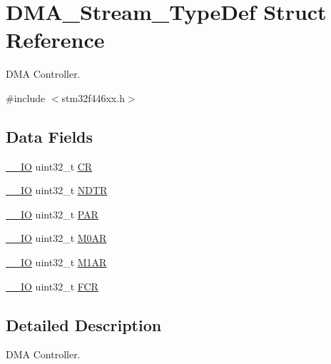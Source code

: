 \hypertarget{struct_d_m_a___stream___type_def}{}\section{D\+M\+A\+\_\+\+Stream\+\_\+\+Type\+Def Struct Reference}
\label{struct_d_m_a___stream___type_def}


D\+MA Controller.  




{\ttfamily \#include $<$stm32f446xx.\+h$>$}

\subsection*{Data Fields}
\begin{DoxyCompactItemize}
\item 
\mbox{\hyperlink{core__sc300_8h_aec43007d9998a0a0e01faede4133d6be}{\+\_\+\+\_\+\+IO}} uint32\+\_\+t \mbox{\hyperlink{struct_d_m_a___stream___type_def_ab40c89c59391aaa9d9a8ec011dd0907a}{CR}}
\item 
\mbox{\hyperlink{core__sc300_8h_aec43007d9998a0a0e01faede4133d6be}{\+\_\+\+\_\+\+IO}} uint32\+\_\+t \mbox{\hyperlink{struct_d_m_a___stream___type_def_af60258ad5a25addc1e8969665d0c1731}{N\+D\+TR}}
\item 
\mbox{\hyperlink{core__sc300_8h_aec43007d9998a0a0e01faede4133d6be}{\+\_\+\+\_\+\+IO}} uint32\+\_\+t \mbox{\hyperlink{struct_d_m_a___stream___type_def_aef55be3d948c22dd32a97e8d4f8761fd}{P\+AR}}
\item 
\mbox{\hyperlink{core__sc300_8h_aec43007d9998a0a0e01faede4133d6be}{\+\_\+\+\_\+\+IO}} uint32\+\_\+t \mbox{\hyperlink{struct_d_m_a___stream___type_def_a63b4d166f4ab5024db6b493a7ab7b640}{M0\+AR}}
\item 
\mbox{\hyperlink{core__sc300_8h_aec43007d9998a0a0e01faede4133d6be}{\+\_\+\+\_\+\+IO}} uint32\+\_\+t \mbox{\hyperlink{struct_d_m_a___stream___type_def_aee7782244ceb4791d9a3891804ac47ac}{M1\+AR}}
\item 
\mbox{\hyperlink{core__sc300_8h_aec43007d9998a0a0e01faede4133d6be}{\+\_\+\+\_\+\+IO}} uint32\+\_\+t \mbox{\hyperlink{struct_d_m_a___stream___type_def_a5d5cc7f32884945503dd29f8f6cbb415}{F\+CR}}
\end{DoxyCompactItemize}


\subsection{Detailed Description}
D\+MA Controller. 

